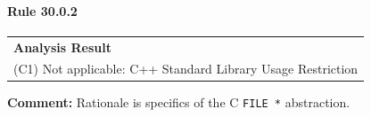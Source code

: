 \paragraph{Rule 30.0.2}
\begin{longtable}{p{13cm}}
\textbf{Analysis Result} \\
(C1) Not applicable: C++ Standard Library Usage Restriction \\
\end{longtable}
\textbf{Comment:} Rationale is specifics of the C \texttt{FILE *} abstraction. \\
